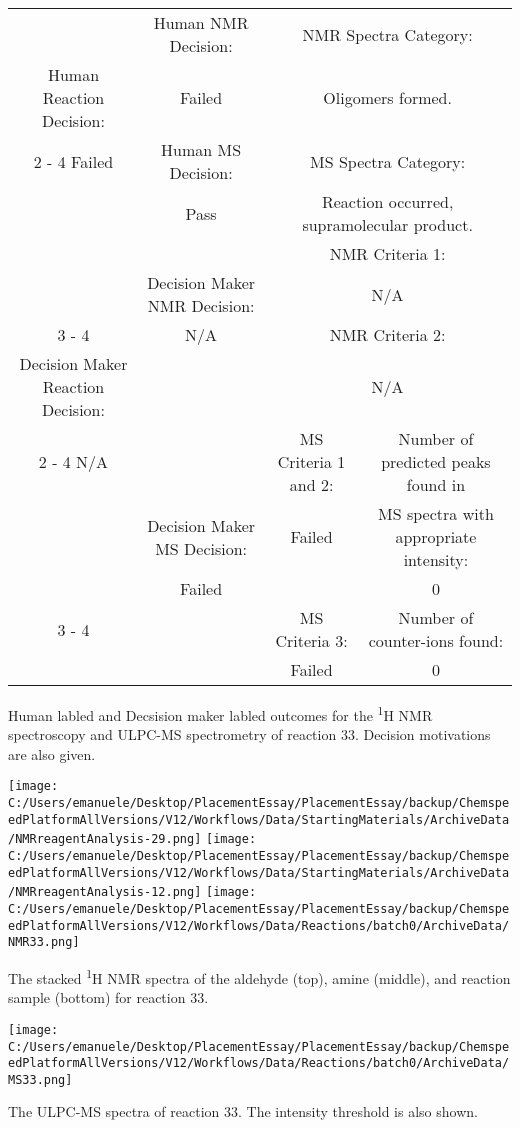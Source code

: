 \documentclass{article}%
\begin{document}
\begin{Decision Table}[H]%
\begin{tabular}{|c|c|c|c|}%
\hline%
&Human NMR Decision:&\multicolumn{2}{|c|}{NMR Spectra Category:}\\%
Human Reaction Decision:&Failed&\multicolumn{2}{|c|}{Oligomers formed.}\\%
\cline{2%
-%
4}%
Failed&Human MS Decision:&\multicolumn{2}{|c|}{MS Spectra Category:}\\%
&Pass&\multicolumn{2}{|c|}{Reaction occurred, supramolecular product.}\\%
\hline%
&&\multicolumn{2}{|c|}{NMR Criteria 1:}\\%
&Decision Maker NMR Decision:&\multicolumn{2}{|c|}{N/A}\\%
\cline{3%
-%
4}%
&N/A&\multicolumn{2}{|c|}{NMR Criteria 2:}\\%
Decision Maker Reaction Decision:&&\multicolumn{2}{|c|}{N/A}\\%
\cline{2%
-%
4}%
N/A&&MS Criteria 1 and 2:&Number of predicted peaks found in\\%
&Decision Maker MS Decision:&Failed&MS spectra with appropriate intensity:\\%
&Failed&&0\\%
\cline{3%
-%
4}%
&&MS Criteria 3:&Number of counter{-}ions found:\\%
&&Failed&0\\%
\hline%
\end{tabular}%
\caption{Human labled and Decsision maker labled outcomes for the \textsuperscript{1}H NMR spectroscopy and ULPC-MS spectrometry of reaction 33. Decision motivations are also given.}%
\end{Decision Table}%
\begin{NMR Spectra}[H]%
\begin{center}%
\texttt{[image: C:/Users/emanuele/Desktop/PlacementEssay/PlacementEssay/backup/ChemspeedPlatformAllVersions/V12/Workflows/Data/StartingMaterials/ArchiveData/NMRreagentAnalysis-29.png]}\hfill%
\texttt{[image: C:/Users/emanuele/Desktop/PlacementEssay/PlacementEssay/backup/ChemspeedPlatformAllVersions/V12/Workflows/Data/StartingMaterials/ArchiveData/NMRreagentAnalysis-12.png]}\hfill%
\texttt{[image: C:/Users/emanuele/Desktop/PlacementEssay/PlacementEssay/backup/ChemspeedPlatformAllVersions/V12/Workflows/Data/Reactions/batch0/ArchiveData/NMR33.png]}\hfill%
\end{center}%
\caption{The stacked \textsuperscript{1}H NMR spectra of the aldehyde (top), amine (middle), and reaction sample (bottom) for reaction 33.}%
\end{NMR Spectra}%
\begin{MS Spectra}[H]%
\begin{center}%
\texttt{[image: C:/Users/emanuele/Desktop/PlacementEssay/PlacementEssay/backup/ChemspeedPlatformAllVersions/V12/Workflows/Data/Reactions/batch0/ArchiveData/MS33.png]}\hfill%
\end{center}%
\caption{The ULPC-MS spectra of reaction 33. The intensity threshold is also shown.}%
\end{MS Spectra}%
\end{document}
